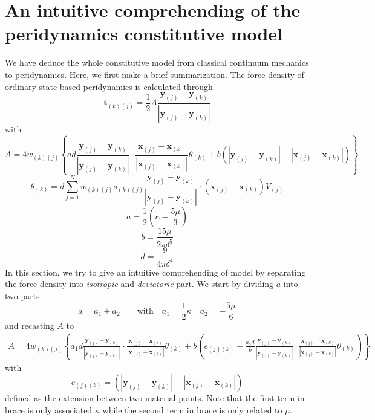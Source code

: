 \documentclass[a4paper,11pt,CJK]{paper}
\newcommand{\bfxj}{\textbf{x}_{(j)}}
\newcommand{\bfyj}{\textbf{y}_{(j)}}
\newcommand{\bfxk}{\textbf{x}_{(k)}}
\newcommand{\bfyk}{\textbf{y}_{(k)}}
\newcommand{\wkj}{w_{(k)(j)}}
\newcommand{\skj}{s_{(k)(j)}}
\newcommand{\tkj}{\textbf{t}_{(k)(j)}}
\newcommand{\thetak}{\theta_{(k)}}
\begin{document}
\section{An intuitive comprehending of the peridynamics constitutive model}
We have deduce the whole constitutive model from classical continuum mechanics to peridynamics. Here, we first make a brief summarization.
The force density of ordinary state-based peridynamics is calculated through
\begin{equation}
\tkj = \frac{1}{2}A\frac{\bfyj - \bfyk}{|\bfyj - \bfyk|}
\end{equation}
with
\begin{equation}
A = 4\wkj\left\{ad\frac{\bfyj-\bfyk}{|\bfyj-\bfyk|}\cdot\frac{\bfxj-\bfxk}{|\bfxj-\bfxk|}\thetak
   +b\left(|\bfyj - \bfyk| - |\bfxj - \bfxk|\right) \right\}
\end{equation}
\begin{equation}
\thetak = d\sum_{j=1}^{N}\wkj\skj\frac{\bfyj - \bfyk}{|\bfyj - \bfyk|}\cdot(\bfxj-\bfxk)V_{(j)}
\end{equation}
\begin{equation}
a = \frac{1}{2}(\kappa - \frac{5\mu}{3})
\end{equation}
\begin{equation}
b = \frac{15\mu}{2\pi\delta^5}
\end{equation}
\begin{equation}
d = \frac{9}{4\pi\delta^4}
\end{equation}
In this section, we try to give an intuitive comprehending of model by separating the force density into \textit{isotropic} and \textit{deviatoric} part.
We start by dividing $a$ into two parts
\begin{equation}
a = a_1 + a_2 \qquad \mathrm{with}\quad a_1 = \frac{1}{2}\kappa \quad a_2 = -\frac{5\mu}{6}
\end{equation}
and recasting $A$ to 
\begin{equation}
\begin{aligned}
A =4\wkj\left\{a_1d\frac{\bfyj-\bfyk}{|\bfyj-\bfyk|}\cdot\frac{\bfxj-\bfxk}{|\bfxj-\bfxk|}\thetak
   +b\left(e_{(j)(k)} + \frac{a_2d}{b}\frac{\bfyj-\bfyk}{|\bfyj-\bfyk|}\cdot\frac{\bfxj-\bfxk}{|\bfxj-\bfxk|}\thetak\right) \right\}
\end{aligned}
\end{equation}
with
\begin{equation}
e_{(j)(k)} = (|\bfyj - \bfyk| - |\bfxj - \bfxk|)
\end{equation}
defined as the extension between two material points. Note that the first term in brace is only associated $\kappa$ while the second term in brace is only related to $\mu$.
\end{document}
